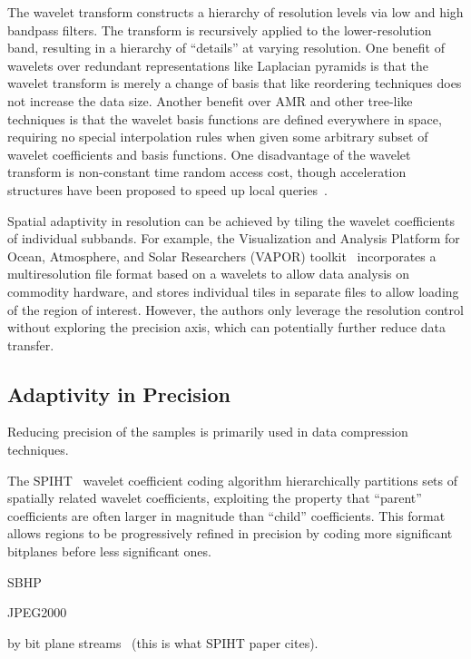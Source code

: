 The wavelet transform constructs a hierarchy of resolution levels via
low and high bandpass filters.  The transform is recursively applied to the
lower-resolution band, resulting in a hierarchy of ``details'' at varying
resolution.  One benefit of wavelets over redundant representations
like Laplacian pyramids is that the wavelet transform is merely a change of
basis that like reordering techniques does not increase the data size.
Another benefit over AMR and other tree-like techniques is that the wavelet
basis functions are defined everywhere in space, requiring no special
interpolation rules when given some arbitrary subset of wavelet coefficients
and basis functions.
One disadvantage of the wavelet transform is non-constant time random access
cost, though acceleration structures have been proposed to speed up
local queries~\cite{weiss}.

Spatial adaptivity in resolution can be achieved
by tiling the wavelet coefficients of individual subbands. 
For example, the Visualization and Analysis Platform for Ocean, Atmosphere, and Solar Researchers
(VAPOR) toolkit~\cite{multires_toolkit2003, vapor2007} incorporates a multiresolution file
format based on a wavelets to allow data analysis on commodity hardware, and stores individual tiles in
separate files to allow loading of the region of interest.
However, the authors only leverage the resolution control without exploring the precision axis,
which can potentially further reduce data transfer.


\subsection{Adaptivity in Precision}
Reducing precision of the samples is primarily used in data compression techniques. 

The SPIHT~\cite{spiht1996} wavelet coefficient coding algorithm hierarchically
partitions sets of spatially related wavelet coefficients, exploiting the
property that ``parent'' coefficients are often larger in magnitude than
``child'' coefficients.
This format allows regions to be progressively refined in precision by coding
more significant bitplanes before less significant ones.


SBHP~\cite{sbhp2000}

JPEG2000~\cite{jpeg2001}

by bit plane streams~\cite{compression_techniques1991} (this is what SPIHT paper cites).


